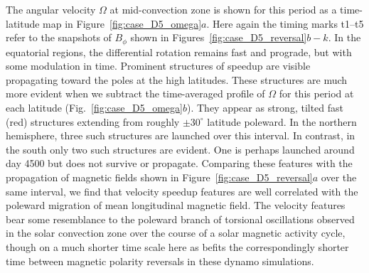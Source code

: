 The angular velocity $\Omega$ at mid-convection zone is shown for this
period as a time-latitude map in Figure~\ref{fig:case_D5_omega}$a$.
Here again the timing marks t1--t5 refer to the snapshots of $B_\phi$
shown in Figures~\ref{fig:case_D5_reversal}$b-k$.
In the equatorial regions, the differential rotation remains fast and
prograde, but with some modulation in time.  Prominent structures of
speedup are visible propagating toward the poles at the high
latitudes.   These structures are much more evident when we subtract
the time-averaged profile of $\Omega$ for this period at each
latitude (Fig.~\ref{fig:case_D5_omega}$b$).  They appear as strong,
tilted fast (red) structures extending from roughly $\pm30^\circ$
latitude poleward.  In the northern hemisphere, three such structures
are launched over this interval.  In contrast, in the south only two
such structures are evident.  One is perhaps launched around day 4500
but does not survive or propagate.  Comparing these features with the
propagation of magnetic fields shown in
Figure~\ref{fig:case_D5_reversal}$a$ over the same interval, we find
that velocity speedup features are well correlated with the poleward
migration of mean longitudinal magnetic field.
The velocity features bear some resemblance to the poleward
branch of torsional oscillations observed in the solar convection
zone over the course of a solar magnetic activity cycle, though on a
much shorter time scale here as befits the correspondingly shorter time
between magnetic polarity reversals in these dynamo simulations.  

